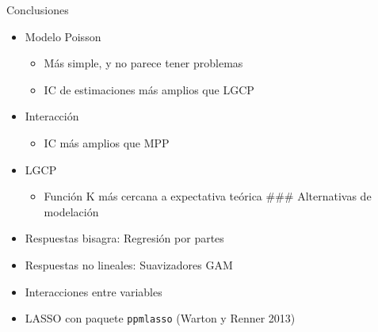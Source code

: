 \documentclass[
  11pt,
  ignorenonframetext,
]{beamer}
\providecommand{\tightlist}{%
  \setlength{\itemsep}{0pt}\setlength{\parskip}{0pt}}
\begin{document}
\begin{frame}[fragile]{Conclusiones}
\protect\hypertarget{conclusiones}{}
\begin{itemize}
\item
  Modelo Poisson

  \begin{itemize}
  \tightlist
  \item
    Más simple, y no parece tener problemas
  \item
    IC de estimaciones más amplios que LGCP
  \end{itemize}
\item
  Interacción

  \begin{itemize}
  \tightlist
  \item
    IC más amplios que MPP
  \end{itemize}
\item
  LGCP

  \begin{itemize}
  \tightlist
  \item
    Función K más cercana a expectativa teórica \#\#\# Alternativas de
    modelación
  \end{itemize}
\item
  Respuestas bisagra: Regresión por partes
\item
  Respuestas no lineales: Suavizadores GAM
\item
  Interacciones entre variables
\item
  LASSO con paquete \texttt{ppmlasso} (Warton y Renner 2013)
\end{itemize}
\end{frame}
\end{document}
